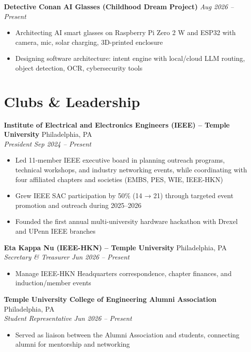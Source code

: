 \documentclass[11pt, letterpaper]{article}
\newcommand{\roleentry}[4]{%
    \noindent\textbf{#1} \hfill #2 \\
    \textit{#3} \hfill \textit{#4}%
    \vspace{0pt}
}
\newcommand{\projectentry}[2]{%
    \noindent\textbf{#1} \hfill \textit{#2}%
    \vspace{0pt}
}
\begin{document}
\vspace{1pt}
\projectentry{Detective Conan AI Glasses (Childhood Dream Project)}{Aug 2026 -- Present}
\begin{itemize}
    \item Architecting AI smart glasses on Raspberry Pi Zero 2 W and ESP32 with camera, mic, solar charging, 3D-printed enclosure
    \item Designing software architecture: intent engine with local/cloud LLM routing, object detection, OCR, cybersecurity tools
\end{itemize}

\vspace{2pt}

\section{Clubs \& Leadership}

\roleentry{Institute of Electrical and Electronics Engineers (IEEE) -- Temple University}{Philadelphia, PA}%
    {President}{Sep 2024 -- Present}
\begin{itemize}
    \item Led 11-member IEEE executive board in planning outreach programs, technical workshops, and industry networking events, while coordinating with four affiliated chapters and societies (EMBS, PES, WIE, IEEE-HKN)
    \item Grew IEEE SAC participation by 50\% (14 → 21) through targeted event promotion and outreach during 2025–2026
    \item Founded the first annual multi-university hardware hackathon with Drexel and UPenn IEEE branches
\end{itemize}

\vspace{1pt}
\roleentry{Eta Kappa Nu (IEEE-HKN) -- Temple University}{Philadelphia, PA}%
    {Secretary \& Treasurer}{Jun 2026 -- Present}
\begin{itemize}
    \item Manage IEEE-HKN Headquarters correspondence, chapter finances, and induction/member events
\end{itemize}

\vspace{1pt}
\roleentry{Temple University College of Engineering Alumni Association}{Philadelphia, PA}%
    {Student Representative}{Jun 2026 -- Present}
\begin{itemize}
    \item Served as liaison between the Alumni Association and students, connecting alumni for mentorship and networking
\end{itemize}
\end{document}
